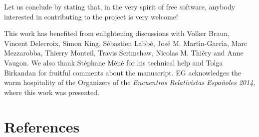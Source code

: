 \documentclass[a4paper]{jpconf}
\begin{document}
Let us conclude by stating that, in the very spirit of free software, 
anybody interested in contributing to the project is very welcome!


\ack
This work has benefited from enlightening discussions with Volker Braun,
Vincent Delecroix, Simon King, S\'ebastien Labb\'e, Jos\'e M. Mart\'\i n-Garc\'\i a, 
Marc Mezzarobba, Thierry Monteil, Travis Scrimshaw,  Nicolas M.  Thi\'ery
and Anne Vaugon. 
We also thank St\'ephane M\'en\'e for his technical help and
Tolga Birkandan for fruitful comments about the manuscript.
EG acknowledges the warm hospitality of the Organizers of the
\emph{Encuentros Relativistas Espa\~noles 2014}, where this work was
presented. 


\section*{References}
\end{document}
